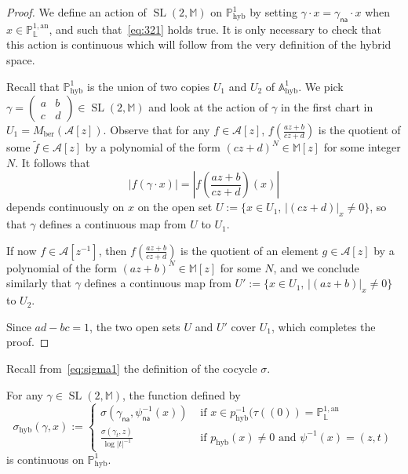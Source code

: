 \documentclass[10pt]{amsart}
\theoremstyle{definition}\newtheorem{defi}[theo]{Definition}\newtheorem{rema}[theo]{Remark}\newtheorem{exam}[theo]{Example}\newtheorem{exem}[theo]{Example}\newtheorem{nota}[theo]{Notation}
\DeclareMathOperator{\hyb}{hyb}
\DeclareMathOperator{\SL}{SL}
\newcommand{\cA}{\mathcal{A}}
\newcommand{\mm}{\mathbb{M}}
\newcommand{\A}{{\mathbb A}}
\newcommand{\an}{\mathrm{an}}
\newcommand{\PP}{\mathbb{P}}
\newcommand{\Laurent}{\mathbb{L}}
\newcommand{\lrpar}[1]{\left(#1\right)}
\newcommand{\na}{\mathsf{na}}
\newcommand{\inv}{^{-1}}
\begin{document}
\begin{proof}
We define an action of $\SL(2,\mm)$ on $\PP^1_{\hyb}$ by setting $\gamma \cdot x = \gamma_{\na} \cdot x$ when $x\in \PP^{1,\an}_{\Laurent}$, and such that~\eqref{eq:321} holds true. It is only necessary to check that this action is continuous which will follow from the very definition of the hybrid space.

Recall that $\PP^1_{\hyb}$ is the union of two copies $U_1$ and $U_2$ of $\A^1_{\hyb}$. We pick $\gamma = \lrpar{
\begin{smallmatrix} a & b \\ c & d
\end{smallmatrix}} \in \SL(2,\mm)$
and look at the action of $\gamma$ in the first chart in $U_1= M_{\mathrm{ber}}(\cA[z])$. Observe that for any $f\in \cA[z]$, $f(\frac{az+b}{cz+d})$ is the quotient of some $\widetilde{f}\in \cA[z]$ by a polynomial of the form $(cz+d)^N\in \mm[z]$ for some integer $N$. It follows that
\[
|f(\gamma \cdot x)| = \left|f\left(\frac{az+b}{cz+d}\right) (x)\right|
\]
depends continuously on $x$ on the open set $U:= \{x\in U_1, \, |(cz+d)|_x\neq 0\}$, so that $\gamma$ defines a continuous map from $U$ to $U_1$.

If now $f\in \cA[z^{-1}]$, then $f(\frac{az+b}{cz+d})$ is the quotient of an element $g\in \cA[z]$ by a polynomial of the form $(az+b)^N\in \mm[z]$ for some $N$, and we conclude similarly that $\gamma$ defines a continuous map from $U':= \{x\in U_1, \, |(az+b)|_x\neq 0\}$ to $U_2$.

Since $ad-bc =1$, the two open sets $U$ and $U'$ cover $U_1$, which completes the proof.
\end{proof}

Recall from~\eqref{eq:sigma1} the definition of the cocycle $\sigma$.

\begin{prop}\label{prop:hybrid sigma}
For any $\gamma\in \SL(2,\mm)$, the function defined by
\[
\sigma_{\hyb}(\gamma,x) :=
\begin{cases}
\sigma(\gamma_\na,\psi_\na\inv(x)) & \text{ if } x \in p_{\hyb}^{-1}(\tau((0)) = \PP^{1,\an}_{\Laurent}
\\
\frac{\sigma(\gamma_t,z)}{\log\mathopen|t\mathclose|^{-1}}& \text{ if } p_{\hyb}(x) \neq 0 \text{ and } \psi^{-1}(x) = (z,t)
\end{cases}
\]
is continuous on $\PP^1_{\hyb}$.
\end{prop}
\end{document}

